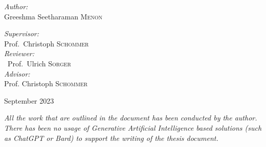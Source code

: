\begin{titlepage}
\begin{center}
\vspace{4cm}
\begin{minipage}[t]{0.4\textwidth}
\begin{flushleft} \large
\emph{Author:}\\
Greeshma Seetharaman \textsc{Menon}
\end{flushleft}
\end{minipage}
\begin{minipage}[t]{0.4\textwidth}
\begin{flushright} \large
\emph{Supervisor:} \\
Prof.~Christoph \textsc{Schommer} \\
\vspace{.5em}
\emph{Reviewer:} \\
~Prof.~Ulrich \textsc{Sorger} \\
\vspace{.5em}
\emph{Advisor:} \\
Prof. Christoph \textsc{Schommer}
\end{flushright}
\end{minipage}

\vfill

{\large September 2023}

\end{center}

\end{titlepage}


\vspace*{\fill}
\textit{All the work that are outlined in the document has been conducted by the author. There has been no usage of Generative Artificial Intelligence based solutions (such as ChatGPT or Bard) to support the writing of the thesis document. }
\vspace*{\fill}

\begin{center}

\end{center}

